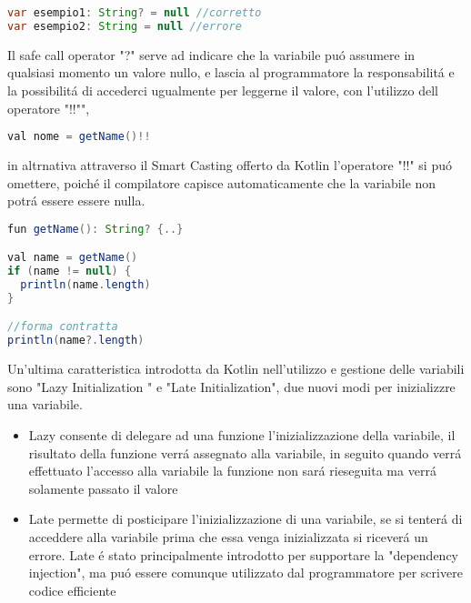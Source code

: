 \begin{lstlisting}[language=java,caption={Esempio}]
var esempio1: String? = null //corretto
var esempio2: String = null //errore
\end{lstlisting}

Il safe call operator "?" serve ad indicare che la variabile pu\'o assumere in qualsiasi momento un valore nullo, e lascia al programmatore la responsabilit\'a e la possibilit\'a di accederci ugualmente per leggerne il valore, con l'utilizzo dell operatore "!!"",


\begin{lstlisting}[language=java,caption={Esempio !!}]
val nome = getName()!!
\end{lstlisting}

in altrnativa attraverso il Smart Casting offerto da Kotlin l'operatore "!!" si pu\'o omettere, poich\'e il compilatore capisce automaticamente che la variabile non potr\'a essere essere nulla.

\begin{lstlisting}[language=java,caption={Smart Casting}]
fun getName(): String? {..}

val name = getName()
if (name != null) {
  println(name.length)
}

//forma contratta
println(name?.length)
\end{lstlisting}

Un'ultima caratteristica introdotta da Kotlin nell'utilizzo e gestione delle variabili sono  "Lazy  Initialization " e "Late Initialization", due nuovi modi per inizializzre una variabile.
\begin{itemize}                         %
\item Lazy consente di delegare ad una funzione l'inizializzazione della variabile, il risultato della funzione verr\'a assegnato alla variabile, in seguito quando verr\'a effettuato l'accesso alla variabile la funzione non sar\'a rieseguita ma verr\'a solamente passato il valore
\item Late permette di posticipare l'inizializzazione di una variabile, se si tenter\'a di acceddere alla variabile prima che essa venga inizializzata si ricever\'a un errore. Late \'e  stato principalmente introdotto per supportare la "dependency injection", ma pu\'o essere comunque utilizzato dal programmatore per scrivere codice efficiente
\end{itemize}





